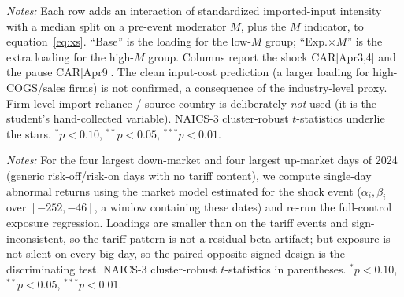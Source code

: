 \documentclass[12pt]{article}
\begin{document}
\begin{table}[htbp]\centering
\begin{threeparttable}
\caption{Heterogeneity of the exposure loading by observable pre-event moderators}
\label{tab:hetero}\small

\begin{tablenotes}\small\item \textit{Notes:} Each row adds an interaction of standardized
imported-input intensity with a median split on a pre-event moderator $M$, plus the $M$
indicator, to equation~\eqref{eq:xs}. ``Base'' is the loading for the low-$M$ group;
``Exp.$\times M$'' is the extra loading for the high-$M$ group. Columns report the shock
CAR[Apr3,4] and the pause CAR[Apr9]. The clean input-cost prediction (a larger loading for
high-COGS/sales firms) is not confirmed, a consequence of the industry-level proxy. Firm-level
import reliance / source country is deliberately \emph{not} used (it is the student's
hand-collected variable). NAICS-3 cluster-robust $t$-statistics underlie the stars.
$^{*}p<0.10$, $^{**}p<0.05$, $^{***}p<0.01$.
\end{tablenotes}
\end{threeparttable}
\end{table}

\begin{table}[htbp]\centering
\begin{threeparttable}
\caption{Falsification: exposure loadings on non-tariff big-market-move days (2024)}
\label{tab:placebo}\small

\begin{tablenotes}\small\item \textit{Notes:} For the four largest down-market and four
largest up-market days of 2024 (generic risk-off/risk-on days with no tariff content), we
compute single-day abnormal returns using the market model estimated for the shock event
($\alpha_i,\beta_i$ over $[-252,-46]$, a window containing these dates) and re-run the
full-control exposure regression. Loadings are smaller than on the tariff events and
sign-inconsistent, so the tariff pattern is not a residual-beta artifact; but exposure is not
silent on every big day, so the paired opposite-signed design is the discriminating test.
NAICS-3 cluster-robust $t$-statistics in parentheses.
$^{*}p<0.10$, $^{**}p<0.05$, $^{***}p<0.01$.
\end{tablenotes}
\end{threeparttable}
\end{table}
\end{document}
